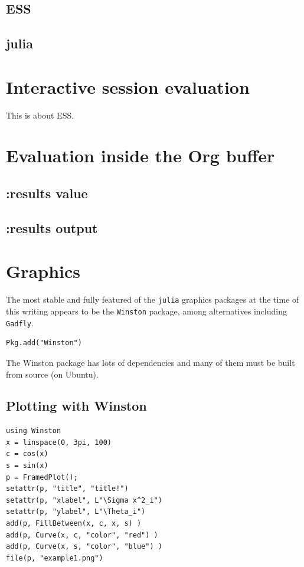 \documentclass[11pt]{article}
\begin{document}
\subsection{ESS}
\label{sec-2-2}

\subsection{julia}
\label{sec-2-3}
\section{Interactive session evaluation}
\label{sec-3}

This is about ESS.
\section{Evaluation inside the Org buffer}
\label{sec-4}

\subsection{:results value}
\label{sec-4-1}

\subsection{:results output}
\label{sec-4-2}
\section{Graphics}
\label{sec-5}

The most stable and fully featured of the \texttt{julia} graphics packages at the time of this writing appears to be the \texttt{Winston} package, among alternatives including \texttt{Gadfly}.

\begin{verbatim}
Pkg.add("Winston")
\end{verbatim}

The Winston package has lots of dependencies and many of them must be built from source (on Ubuntu).


\subsection{Plotting with Winston}
\label{sec-5-1}

\begin{verbatim}
using Winston
x = linspace(0, 3pi, 100)
c = cos(x)
s = sin(x)
p = FramedPlot();
setattr(p, "title", "title!")
setattr(p, "xlabel", L"\Sigma x^2_i")
setattr(p, "ylabel", L"\Theta_i")
add(p, FillBetween(x, c, x, s) )
add(p, Curve(x, c, "color", "red") )
add(p, Curve(x, s, "color", "blue") )
file(p, "example1.png")
\end{verbatim}
\end{document}
